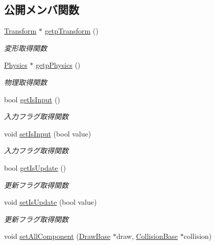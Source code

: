 \subsection*{公開メンバ関数}
\begin{DoxyCompactItemize}
\item 
\mbox{\hyperlink{class_transform}{Transform}} $\ast$ \mbox{\hyperlink{class_game_object_base_ab2550083f7eed51fc77b3a86ddafd9fb}{getp\+Transform}} ()
\begin{DoxyCompactList}\small\item\em 変形取得関数 \end{DoxyCompactList}\item 
\mbox{\hyperlink{class_physics}{Physics}} $\ast$ \mbox{\hyperlink{class_game_object_base_a0d3bc35686dcbf8a209017ec01708255}{getp\+Physics}} ()
\begin{DoxyCompactList}\small\item\em 物理取得関数 \end{DoxyCompactList}\item 
bool \mbox{\hyperlink{class_game_object_base_ad89288cb66472324b9afc39a3afb1c2f}{get\+Is\+Input}} ()
\begin{DoxyCompactList}\small\item\em 入力フラグ取得関数 \end{DoxyCompactList}\item 
void \mbox{\hyperlink{class_game_object_base_affe3edcdf6374f2138c306007fa66fca}{set\+Is\+Input}} (bool value)
\begin{DoxyCompactList}\small\item\em 入力フラグ取得関数 \end{DoxyCompactList}\item 
bool \mbox{\hyperlink{class_game_object_base_a424c78f66de1b6d7ab47633cdd5e90f0}{get\+Is\+Update}} ()
\begin{DoxyCompactList}\small\item\em 更新フラグ取得関数 \end{DoxyCompactList}\item 
void \mbox{\hyperlink{class_game_object_base_aba5110b5f5a877c95ebc675cef428679}{set\+Is\+Update}} (bool value)
\begin{DoxyCompactList}\small\item\em 更新フラグ取得関数 \end{DoxyCompactList}\item 
void \mbox{\hyperlink{class_game_object_base_ae17ca64413424b2ad5701d31e74ea501}{set\+All\+Component}} (\mbox{\hyperlink{class_draw_base}{Draw\+Base}} $\ast$draw, \mbox{\hyperlink{class_collision_base}{Collision\+Base}} $\ast$collision)

\end{DoxyCompactItemize}
